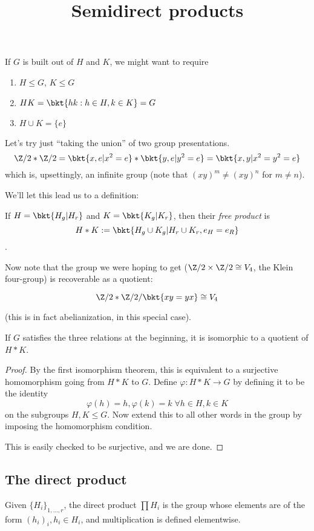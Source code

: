 \documentclass{article}
\title{Semidirect products}
\begin{document}
\maketitle
 
If $G$ is built out of $H$ and $K$, we might want to require
\begin{enumerate}
\item $H\leq G$, $K\leq G$
\item $HK = \bkt{hk : h\in H, k\in K} = G$
\item $H\cup K = \{e\}$
\end{enumerate}

Let's try just ``taking the union'' of two group presentations.
$$\Z/2 \ast \Z/2 = \bkt{x,e|x^2=e} \ast \bkt{y,e|y^2=e} = \bkt{x,y|x^2=y^2=e}$$
which is, upsettingly, an infinite group (note that $(xy)^m \neq (xy)^n$
for $m\neq n$).

We'll let this lead us to a definition:
\begin{defn}
  If $H=\bkt{H_g | H_r}$ and $K=\bkt{K_g|K_r}$, then their \textit{free product} is 
  $$H\ast K:= \bkt{H_g\cup K_g | H_r\cup K_r, e_H=e_R}$$.
\end{defn}

Now note that the group we were hoping to get ($\Z/2\times\Z/2\cong V_4$, the
Klein four-group) is recoverable as a quotient:

$$\Z/2\ast\Z/2/\bkt{xy=yx} \cong V_4$$

(this is in fact abelianization, in this special case).

\begin{thm}
 If $G$ satisfies the three relations at the beginning, it is isomorphic to a
 quotient of $H\ast K$. 
\end{thm}

\begin{proof}
 By the first isomorphism theorem, this is equivalent to a surjective
 homomorphism going from $H\ast K$ to $G$. Define $\varphi: H\ast K\to G$ by
 defining it to be the identity
 $$\varphi(h) = h, \varphi(k) = k \; \forall h\in H, k\in K$$
 on the subgroups $H,K\leq G$. Now extend this to all other words in the group
 by imposing the homomorphism condition.

 This is easily checked to be surjective, and we are done.
\end{proof}

\subsection{The direct product}
Given $\{H_i\}_{1,\ldots,r}$, the direct product $\prod H_i$ is the group whose elements
are of the form $(h_i)_i, h_i\in H_i$, and multiplication is defined elementwise.
\end{document}
